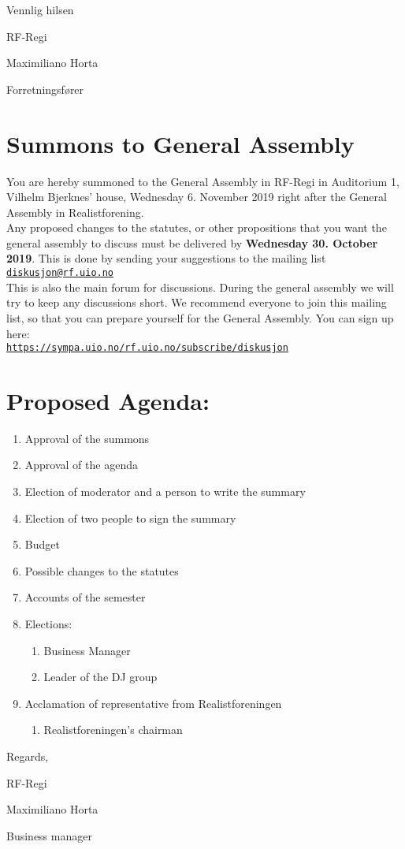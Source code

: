 \documentclass[a4paper]{article}
\begin{document}
\vspace{2.5cm}

Vennlig hilsen

RF-Regi

Maximiliano Horta

Forretningsfører

\newpage

\section*{\textsf{\textbf{\huge Summons to General Assembly}}}
\vspace{1cm}

You are hereby summoned to the General Assembly in RF-Regi in Auditorium 1,
Vilhelm Bjerknes' house, Wednesday 6. November 2019 right after
the General Assembly in Realistforening. \\


Any proposed changes to the statutes, or other propositions that you want the general
assembly to discuss must be delivered by \textbf{Wednesday 30. October 2019}.
This is done by sending your suggestions to the mailing list \linebreak
\href{mailto:diskusjon@rf.uio.no}{\texttt{diskusjon@rf.uio.no}} \\


This is also the main forum for discussions. During the general assembly we will try to keep
any discussions short. We recommend everyone to join this mailing list, so that you can
prepare yourself for the General Assembly. You can sign up here: \\
\texttt{\url{https://sympa.uio.no/rf.uio.no/subscribe/diskusjon}}\\

\section*{\textsf{Proposed Agenda:}}
\begin{enumerate}
    \item Approval of the summons
    \item Approval of the agenda
    \item Election of moderator and a person to write the summary
    \item Election of two people to sign the summary
    \item Budget 
    \item Possible changes to the statutes
    \item Accounts of the semester
    \item Elections:
    \begin{enumerate}
        \item Business Manager
        \item Leader of the DJ group
    \end{enumerate}
    \item Acclamation of representative from Realistforeningen
    \begin{enumerate}
        \item Realistforeningen's chairman
    \end{enumerate}
\end{enumerate}

\vspace{2cm}
Regards,

RF-Regi

Maximiliano Horta

Business manager
\end{document}
